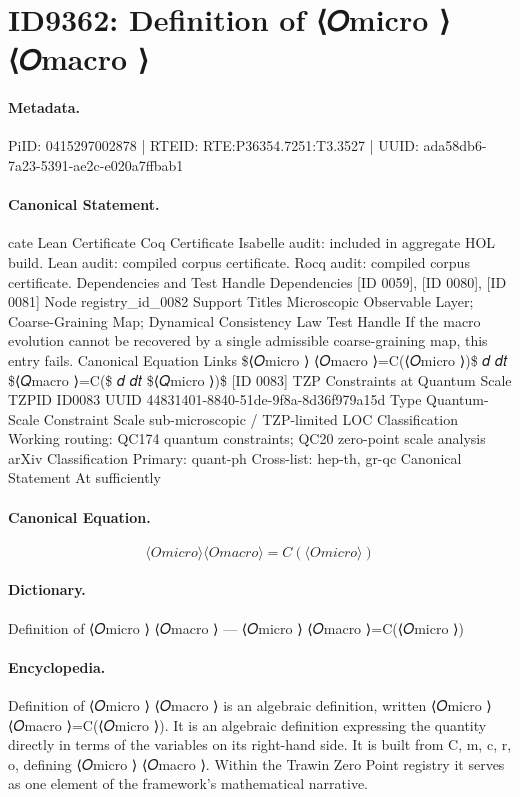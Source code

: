 \section*{ID9362: Definition of ⟨𝑂micro ⟩ ⟨𝑂macro ⟩}
\paragraph{Metadata.}
PiID: 0415297002878 | RTEID: RTE:P36354.7251:T3.3527 | UUID: ada58db6-7a23-5391-ae2c-e020a7ffbab1

\paragraph{Canonical Statement.}
cate Lean Certificate Coq Certificate Isabelle audit: included in aggregate HOL build. Lean audit: compiled corpus certificate. Rocq audit: compiled corpus certificate. Dependencies and Test Handle Dependencies [ID 0059], [ID 0080], [ID 0081] Node registry\_id\_0082 Support Titles Microscopic Observable Layer; Coarse-Graining Map; Dynamical Consistency Law Test Handle If the macro evolution cannot be recovered by a single admissible coarse-graining map, this entry fails. Canonical Equation Links \$⟨𝑂micro ⟩ ⟨𝑂macro ⟩=C(⟨𝑂micro ⟩)\$ 𝑑 𝑑𝑡 \$⟨𝑄macro ⟩=C(\$ 𝑑 𝑑𝑡 \$⟨𝑄micro ⟩)\$ [ID 0083] TZP Constraints at Quantum Scale TZPID ID0083 UUID 44831401-8840-51de-9f8a-8d36f979a15d Type Quantum-Scale Constraint Scale sub-microscopic / TZP-limited LOC Classification Working routing: QC174 quantum constraints; QC20 zero-point scale analysis arXiv Classification Primary: quant-ph Cross-list: hep-th, gr-qc Canonical Statement At sufficiently

\paragraph{Canonical Equation.}
\[
⟨𝑂micro ⟩ ⟨𝑂macro ⟩=C(⟨𝑂micro ⟩)
\]

\paragraph{Dictionary.}
Definition of ⟨𝑂micro ⟩ ⟨𝑂macro ⟩ — ⟨𝑂micro ⟩ ⟨𝑂macro ⟩=C(⟨𝑂micro ⟩)

\paragraph{Encyclopedia.}
Definition of ⟨𝑂micro ⟩ ⟨𝑂macro ⟩ is an algebraic definition, written ⟨𝑂micro ⟩ ⟨𝑂macro ⟩=C(⟨𝑂micro ⟩). It is an algebraic definition expressing the quantity directly in terms of the variables on its right-hand side. It is built from C, m, c, r, o, defining ⟨𝑂micro ⟩ ⟨𝑂macro ⟩. Within the Trawin Zero Point registry it serves as one element of the framework's mathematical narrative.
